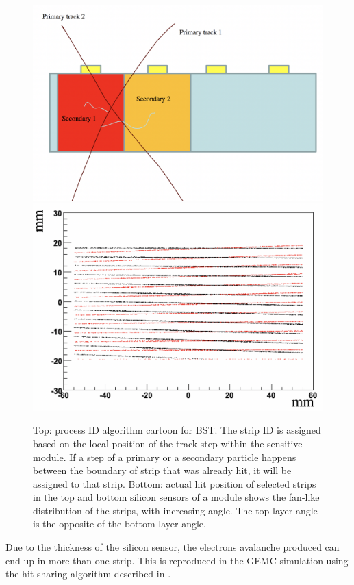 \begin{figure}
	\centering
	\includegraphics[width=0.95\columnwidth,keepaspectratio]{img/bstHit.png}
	\includegraphics[width=0.95\columnwidth,keepaspectratio]{img/bstStrip.png}
	\caption{Top: process ID algorithm cartoon for BST. The strip ID is assigned based on the local position of the track
            step within the sensitive module. If a step of a primary or a secondary particle happens between the boundary
            of strip that was already hit, it will be assigned to that strip. Bottom: actual hit position of selected
            strips in the top and bottom silicon sensors of a module shows the fan-like distribution of the strips,
            with increasing angle. The top layer angle is the opposite of the bottom layer angle. }
	\label{fig:processID}
\end{figure}

Due to the thickness of the silicon sensor, the electrons avalanche produced can end up in more than one strip. This
is reproduced in the GEMC simulation using the hit sharing algorithm described in .


